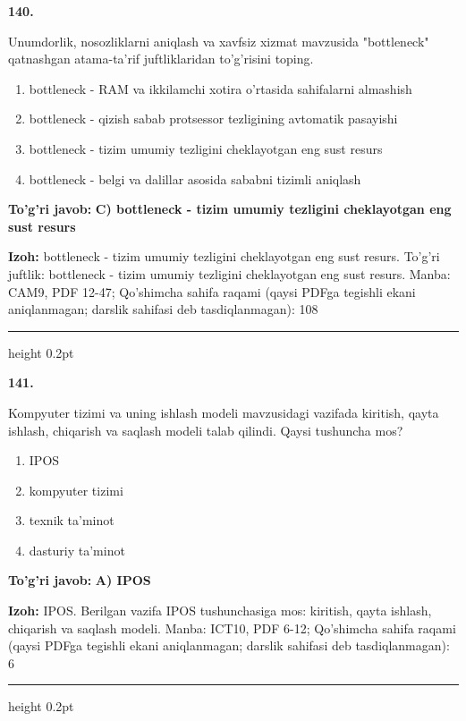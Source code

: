 \documentclass[10pt,a4paper]{article}
\begin{document}
{\bfseries\sffamily\color{ink} 140.}
\par
Unumdorlik, nosozliklarni aniqlash va xavfsiz xizmat mavzusida "bottleneck" qatnashgan atama-ta'rif juftliklaridan to'g'risini toping.
\begin{enumerate}[label=\Alph*),leftmargin=9mm]
\item bottleneck - RAM va ikkilamchi xotira o'rtasida sahifalarni almashish
\item bottleneck - qizish sabab protsessor tezligining avtomatik pasayishi
\item bottleneck - tizim umumiy tezligini cheklayotgan eng sust resurs
\item bottleneck - belgi va dalillar asosida sababni tizimli aniqlash
\end{enumerate}
\begin{tcolorbox}[enhanced,breakable,colback=teal!4,colframe=teal!60!black,boxrule=0.45pt,arc=1.2mm,left=2.7mm,right=2.7mm,top=1.8mm,bottom=1.8mm,before skip=2mm,after skip=2mm]
{\bfseries\sffamily\color{teal}To'g'ri javob:} \textbf{C) bottleneck - tizim umumiy tezligini cheklayotgan eng sust resurs}
\par\smallskip
{\bfseries Izoh:} bottleneck - tizim umumiy tezligini cheklayotgan eng sust resurs. To'g'ri juftlik: bottleneck - tizim umumiy tezligini cheklayotgan eng sust resurs. Manba: CAM9, PDF 12-47; Qo'shimcha sahifa raqami (qaysi PDFga tegishli ekani aniqlanmagan; darslik sahifasi deb tasdiqlanmagan): 108
\end{tcolorbox}
\vspace{2mm}\hrule height 0.2pt\vspace{3mm}

{\bfseries\sffamily\color{ink} 141.}
\par
Kompyuter tizimi va uning ishlash modeli mavzusidagi vazifada kiritish, qayta ishlash, chiqarish va saqlash modeli talab qilindi. Qaysi tushuncha mos?
\begin{enumerate}[label=\Alph*),leftmargin=9mm]
\item IPOS
\item kompyuter tizimi
\item texnik ta'minot
\item dasturiy ta'minot
\end{enumerate}
\begin{tcolorbox}[enhanced,breakable,colback=teal!4,colframe=teal!60!black,boxrule=0.45pt,arc=1.2mm,left=2.7mm,right=2.7mm,top=1.8mm,bottom=1.8mm,before skip=2mm,after skip=2mm]
{\bfseries\sffamily\color{teal}To'g'ri javob:} \textbf{A) IPOS}
\par\smallskip
{\bfseries Izoh:} IPOS. Berilgan vazifa IPOS tushunchasiga mos: kiritish, qayta ishlash, chiqarish va saqlash modeli. Manba: ICT10, PDF 6-12; Qo'shimcha sahifa raqami (qaysi PDFga tegishli ekani aniqlanmagan; darslik sahifasi deb tasdiqlanmagan): 6
\end{tcolorbox}
\vspace{2mm}\hrule height 0.2pt\vspace{3mm}
\end{document}
